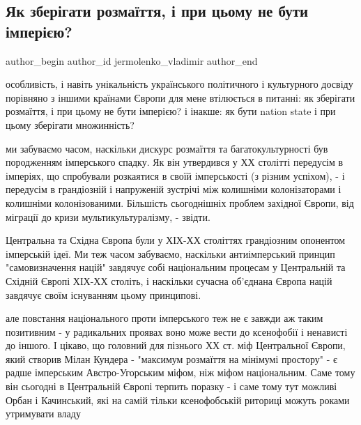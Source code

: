  
 
 
 
 
 
\subsection{Як зберігати розмаїття, і при цьому не бути імперією?}
\label{sec:30_09_2021.fb.jermolenko_vladimir.1.raznoobrazie_imperia}
 
\ifcmt
 author_begin
   author_id jermolenko_vladimir
 author_end
\fi

особливість, і навіть унікальність українського політичного і культурного
досвіду порівняно з іншими країнами Європи для мене втілюється в питанні: як
зберігати розмаїття, і при цьому не бути імперією? і інакше: як бути nation
state і при цьому зберігати множинність?

ми забуваємо часом, наскільки дискурс розмаїття та багатокультурності був
породженням імперського спадку. Як він утвердився у ХХ столітті передусім в
імперіях, що спробували розкаятися в своїй імперськості (з різним успіхом), - і
передусім в грандіозній і напруженій зустрічі між колишніми колонізаторами і
колишніми колонізованими. Більшість сьогоднішніх проблем західної Європи, від
міграції до кризи мультикультуралізму, - звідти. 

Центральна та Східна Європа були у ХІХ-ХХ століттях грандіозним опонентом
імперській ідеї. Ми теж часом забуваємо, наскільки антиімперський принцип
"самовизначення націй" завдячує собі національним процесам у Центральній та
Східній Європі ХІХ-ХХ століть, і наскільки сучасна об'єднана Європа націй
завдячує своїм існуванням цьому принципові.

але повстання національного проти імперського теж не є завжди аж таким
позитивним - у радикальних проявах воно може вести до ксенофобії і ненависті до
іншого. І цікаво, що головний для пізнього ХХ ст. міф Центральної Європи, який
створив Мілан Кундера - "максимум розмаїття на мінімумі простору" - є радше
імперським Австро-Угорським міфом, ніж міфом національним. Саме тому він
сьогодні в Центральній Європі терпить поразку - і саме тому тут можливі Орбан і
Качинський, які на самій тільки ксенофобській риториці можуть роками утримувати
владу

